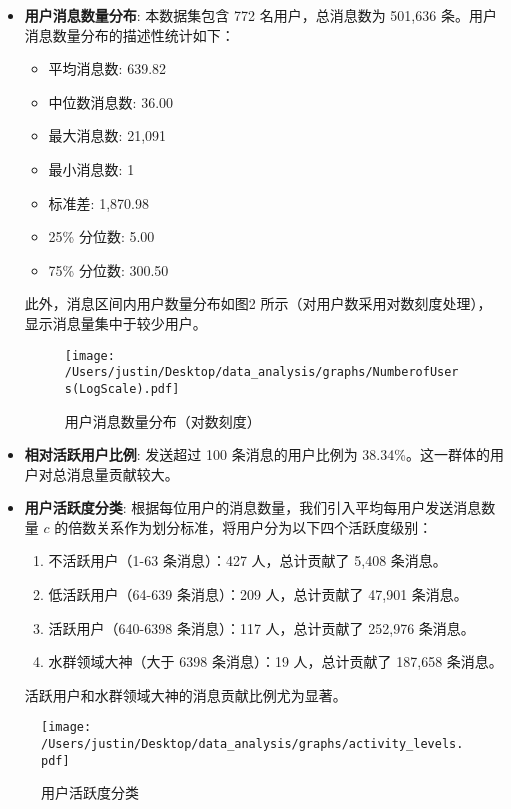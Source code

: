 \documentclass{paper}
\begin{document}
\begin{itemize}
    \item \textbf{用户消息数量分布}: 
    本数据集包含 772 名用户，总消息数为 501,636 条。用户消息数量分布的描述性统计如下：
    \begin{itemize}
        \item 平均消息数: 639.82
        \item 中位数消息数: 36.00
        \item 最大消息数: 21,091
        \item 最小消息数: 1
        \item 标准差: 1,870.98
        \item 25\% 分位数: 5.00
        \item 75\% 分位数: 300.50
    \end{itemize}
    此外，消息区间内用户数量分布如图2 所示（对用户数采用对数刻度处理），显示消息量集中于较少用户。

    \begin{figure}[H]
        \centering
        \texttt{[image: /Users/justin/Desktop/data\_analysis/graphs/NumberofUsers(LogScale).pdf]}
        \caption{用户消息数量分布（对数刻度）}
        \label{fig:2}
    \end{figure}

    \item \textbf{相对活跃用户比例}: 
    发送超过 100 条消息的用户比例为 38.34\%。这一群体的用户对总消息量贡献较大。

    \item \textbf{用户活跃度分类}: 
    根据每位用户的消息数量，我们引入平均每用户发送消息数量 $c$ 的倍数关系作为划分标准，将用户分为以下四个活跃度级别：
    \begin{enumerate}
        \item 不活跃用户（1-63 条消息）：427 人，总计贡献了 5,408 条消息。
        \item 低活跃用户（64-639 条消息）：209 人，总计贡献了 47,901 条消息。
        \item 活跃用户（640-6398 条消息）：117 人，总计贡献了 252,976 条消息。
        \item 水群领域大神（大于 6398 条消息）：19 人，总计贡献了 187,658 条消息。
    \end{enumerate}
    活跃用户和水群领域大神的消息贡献比例尤为显著。

\end{itemize}

\begin{figure}[H]
    \centering
    \texttt{[image: /Users/justin/Desktop/data\_analysis/graphs/activity\_levels.pdf]}
    \caption{用户活跃度分类}
    \label{fig:3}
\end{figure}
\end{document}
